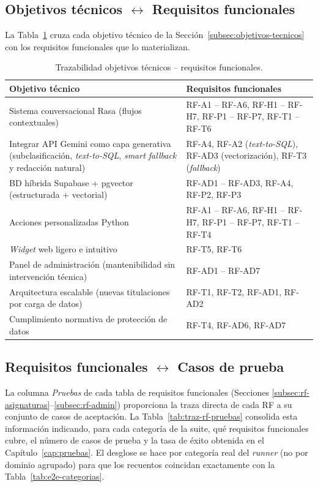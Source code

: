 \subsection{Objetivos técnicos \texorpdfstring{$\leftrightarrow$}{--} Requisitos funcionales}\label{subsec:traz-obj-rf}

La Tabla~\ref{tab:traz-obj-rf} cruza cada objetivo técnico de la Sección~\ref{subsec:objetivos-tecnicos} con los requisitos funcionales que lo materializan.

\begin{table}[hbtp]
\centering
\small
\caption{Trazabilidad objetivos técnicos -- requisitos funcionales.}\label{tab:traz-obj-rf}
\begin{tabular}{|p{5.5cm}|p{7.5cm}|}
\hline
\textbf{Objetivo técnico} & \textbf{Requisitos funcionales} \\ \hline
Sistema conversacional Rasa (flujos contextuales) &
  RF-A1 -- RF-A6, RF-H1 -- RF-H7, RF-P1 -- RF-P7, RF-T1 -- RF-T6 \\ \hline
Integrar API Gemini como capa generativa (subclasificación, \textit{text-to-SQL}, \textit{smart fallback} y redacción natural) &
  RF-A4, RF-A2 (\textit{text-to-SQL}), RF-AD3 (vectorización), RF-T3 (\textit{fallback}) \\ \hline
BD híbrida Supabase + pgvector (estructurada + vectorial) &
  RF-AD1 -- RF-AD3, RF-A4, RF-P2, RF-P3 \\ \hline
Acciones personalizadas Python &
  RF-A1 -- RF-A6, RF-H1 -- RF-H7, RF-P1 -- RF-P7, RF-T1 -- RF-T4 \\ \hline
\textit{Widget} web ligero e intuitivo &
  RF-T5, RF-T6 \\ \hline
Panel de administración (mantenibilidad sin intervención técnica) &
  RF-AD1 -- RF-AD7 \\ \hline
Arquitectura escalable (nuevas titulaciones por carga de datos) &
  RF-T1, RF-T2, RF-AD1, RF-AD2 \\ \hline
Cumplimiento normativa de protección de datos &
  RF-T4, RF-AD6, RF-AD7 \\ \hline
\end{tabular}
\end{table}

\subsection{Requisitos funcionales \texorpdfstring{$\leftrightarrow$}{--} Casos de prueba}\label{subsec:traz-rf-pruebas}

La columna \textit{Pruebas} de cada tabla de requisitos funcionales (Secciones \ref{subsec:rf-asignaturas}--\ref{subsec:rf-admin}) proporciona la traza directa de cada RF a su conjunto de casos de aceptación. La Tabla~\ref{tab:traz-rf-pruebas} consolida esta información indicando, para cada categoría de la suite, qué requisitos funcionales cubre, el número de casos de prueba y la tasa de éxito obtenida en el Capítulo~\ref{cap:pruebas}. El desglose se hace por categoría real del \textit{runner} (no por dominio agrupado) para que los recuentos coincidan exactamente con la Tabla~\ref{tab:e2e-categorias}.

